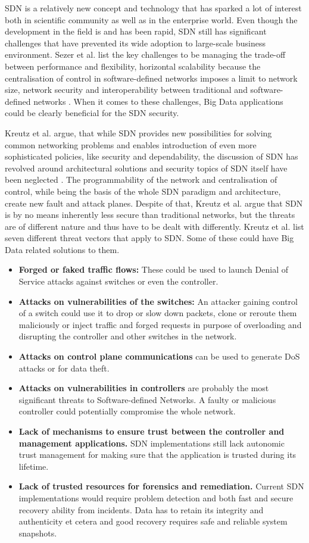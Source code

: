 \documentclass{acm_proc_article-sp}
\begin{document}
SDN is a relatively new concept and technology that has sparked a lot of interest both in scientific community as well as in the enterprise world. Even though the development in the field is and has been rapid, SDN still has significant challenges that have prevented its wide adoption to large-scale business environment. Sezer et al. list the key challenges to be managing the trade-off between performance and flexibility, horizontal scalability because the centralisation of control in software-defined networks imposes a limit to network size, network security and interoperability between traditional and software-defined networks \cite{sezer2013we}. When it comes to these challenges, Big Data applications could be clearly beneficial for the SDN security.

Kreutz et al. argue, that while SDN provides new possibilities for solving common networking problems and enables introduction of even more sophisticated policies, like security and dependability, the discussion of SDN has revolved around architectural solutions and security topics of SDN itself have been neglected  \cite{Kreutz13}. The programmability of the network and centralisation of control, while being the basis of the whole SDN paradigm and architecture, create new fault and attack planes. Despite of that, Kreutz et al. argue that SDN is by no means inherently less secure than traditional networks, but the threats are of different nature and thus have to be dealt with differently.
Kreutz et al. list seven different threat vectors that apply to SDN. Some of these could have Big Data related solutions to them.

\begin{itemize}
\item \textbf{Forged or faked traffic flows:} These could be used to launch Denial of Service attacks against switches or even the controller.
\item \textbf{Attacks on vulnerabilities of the switches:} An attacker gaining control of a switch could use it to drop or slow down packets, clone or reroute them maliciously or inject traffic and forged requests in purpose of overloading and disrupting the controller and other switches in the network.
\item \textbf{Attacks on control plane communications} can be used to generate DoS attacks or for data theft.
\item \textbf{Attacks on vulnerabilities in controllers} are probably the most significant threats to Software-defined Networks. A faulty or malicious controller could potentially compromise the whole network.
\item \textbf{Lack of mechanisms to ensure trust between the controller and management applications.} SDN implementations still lack autonomic trust management for making sure that the application is trusted during its lifetime.
\item \textbf{Lack of trusted resources for forensics and remediation.} Current SDN implementations would require problem detection and both fast and secure recovery ability from incidents. Data has to retain its integrity and authenticity et cetera and good recovery requires safe and reliable system snapshots.
\end{itemize}
\end{document}
